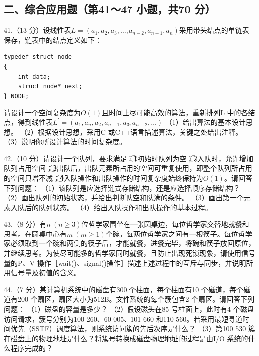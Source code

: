 \documentclass[UTF8,11pt]{ctexart}
\begin{document}
\subsection*{二、综合应用题（第41～47 小题，共70 分）}

41.（13 分）设线性表\(\displaystyle L=(a_1,\allowbreak a_2,\allowbreak a_3,\allowbreak \ldots,\allowbreak a_{n-2},\allowbreak a_{n-1},\allowbreak a_n)\)采用带头结点的单链表保存，链表中的结点定义如下：


\begin{Verbatim}[breaklines,breakanywhere,fontsize=\small]
typedef struct node
{
    int data;
    struct node* next;
} NODE;
\end{Verbatim}

请设计一个空间复杂度为\(\displaystyle O(1)\)且时间上尽可能高效的算法，重新排列L 中的各结点，得到线性表\(\displaystyle L^\prime=(a_1,\allowbreak a_n,\allowbreak a_2,\allowbreak a_{n-1},\allowbreak a_3,\allowbreak a_{n-2},\allowbreak \ldots)\) （1）给出算法的基本设计思想。 （2）根据设计思想，采用C 或C++语言描述算法，关键之处给出注释。 （3）说明你所设计算法的时间复杂度。


42.（10 分）请设计一个队列，要求满足：\textcircled{1}初始时队列为空；\textcircled{2}入队时，允许增加队列占用空间；\textcircled{3}出队后，出队元素所占用的空间可重复使用，即整个队列所占用的空间只增不减；\textcircled{4}入队操作和出队操作的时间复杂度始终保持为\(\displaystyle O(1)\)。请回答下列问题： （1）该队列是应选择链式存储结构，还是应选择顺序存储结构？ （2）画出队列的初始状态，并给出判断队空和队满的条件。 （3）画出第一个元素入队后的队列状态。 （4）给出入队操作和出队操作的基本过程。


43.（8 分）有\(\displaystyle n\ (n\ge3)\)位哲学家围坐在一张圆桌边，每位哲学家交替地就餐和思考。在圆桌中心有\(\displaystyle m\ (m\ge1)\)个碗，每两位哲学家之间有一根筷子。每位哲学家必须取到一个碗和两侧的筷子后，才能就餐，进餐完毕，将碗和筷子放回原位，并继续思考。为使尽可能多的哲学家同时就餐，且防止出现死锁现象，请使用信号量的P、V 操作［wait()、signal()操作］描述上述过程中的互斥与同步，并说明所用信号量及初值的含义。


44.（7 分）某计算机系统中的磁盘有300 个柱面，每个柱面有10 个磁道，每个磁道有200 个扇区，扇区大小为512B。文件系统的每个簇包含2 个扇区。请回答下列问题： （1）磁盘的容量是多少？ （2）假设磁头在85 号柱面上，此时有4 个磁盘访问请求，簇号分别为100 260、60 005、101 660 和110 560。若采用最短寻道时间优先（SSTF）调度算法，则系统访问簇的先后次序是什么？ （3）第100 530 簇在磁盘上的物理地址是什么？将簇号转换成磁盘物理地址的过程是由I/O 系统的什么程序完成的？
\end{document}

